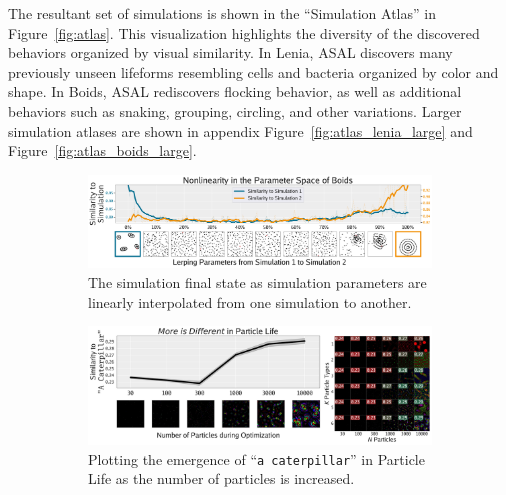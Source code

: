 \documentclass{article}
\begin{document}
The resultant set of simulations is shown in the ``Simulation Atlas'' in Figure~\ref{fig:atlas}.
This visualization highlights the diversity of the discovered behaviors organized by visual similarity.
In Lenia, ASAL discovers many previously unseen lifeforms resembling cells and bacteria organized by color and shape.
In Boids, ASAL rediscovers flocking behavior, as well as additional behaviors such as snaking, grouping, circling, and other variations.
Larger simulation atlases are shown in appendix Figure~\ref{fig:atlas_lenia_large} and Figure~\ref{fig:atlas_boids_large}.





\begin{figure}[htp]
    \centering
    \begin{subfigure}{1.0\textwidth}
        \centering
        \includegraphics[width=\textwidth]{figs/lerp_boids_compressed.pdf}
        \vspace{-6mm}
        \caption{
        The simulation final state as simulation parameters are linearly interpolated from one simulation to another.
        }
        \label{fig:lerping_1}
    \end{subfigure}
    \begin{subfigure}{1.0\textwidth}
        \centering
        \includegraphics[width=\textwidth]{figs/lerp_plife_opt_compressed.pdf}
        \vspace{-6mm}
        \caption{
        Plotting the emergence of ``\texttt{a caterpillar}'' in Particle Life as the number of particles is increased.
        }
        \label{fig:lerping_2}
    \end{subfigure}
    \begin{subfigure}{1.0\textwidth}

\end{subfigure}
\end{figure}
\end{document}
